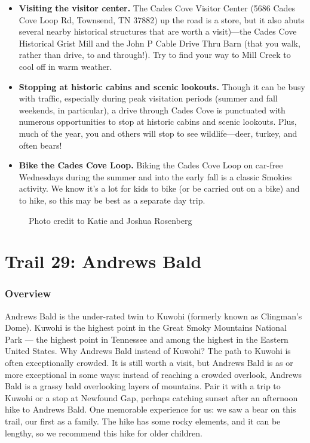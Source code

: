 \documentclass[
  letterpaper,
  DIV=11,
  numbers=noendperiod]{scrreprt}
\makeatletter
\providecommand{\tightlist}{%
  \setlength{\itemsep}{0pt}\setlength{\parskip}{0pt}}\usepackage{longtable,booktabs,array}
\newcommand*\pandocbounded[1]{%
  \sbox\pandoc@box{#1}%
  \Gscale@div\@tempa{\textheight}{\dimexpr\ht\pandoc@box+\dp\pandoc@box\relax}%
  \Gscale@div\@tempb{\linewidth}{\wd\pandoc@box}%
  \ifdim\@tempb\p@<\@tempa\p@\let\@tempa\@tempb\fi%
  \ifdim\@tempa\p@<\p@\scalebox{\@tempa}{\usebox\pandoc@box}%
  \else\usebox{\pandoc@box}%
  \fi%
}
\makeatother
\begin{document}
\begin{itemize}
\tightlist
\item
  \textbf{Visiting the visitor center.} The Cades Cove Visitor Center
  (5686 Cades Cove Loop Rd, Townsend, TN 37882) up the road is a store,
  but it also abuts several nearby historical structures that are worth
  a visit)---the Cades Cove Historical Grist Mill and the John P Cable
  Drive Thru Barn (that you walk, rather than drive, to and through!).
  Try to find your way to Mill Creek to cool off in warm weather.
\item
  \textbf{Stopping at historic cabins and scenic lookouts.} Though it
  can be busy with traffic, especially during peak visitation periods
  (summer and fall weekends, in particular), a drive through Cades Cove
  is punctuated with numerous opportunities to stop at historic cabins
  and scenic lookouts. Plus, much of the year, you and others will stop
  to see wildlife---deer, turkey, and often bears!
\item
  \textbf{Bike the Cades Cove Loop.} Biking the Cades Cove Loop on
  car-free Wednesdays during the summer and into the early fall is a
  classic Smokies activity. We know it's a lot for kids to bike (or be
  carried out on a bike) and to hike, so this may be best as a separate
  day trip.
\end{itemize}

\begin{figure}[H]

{\centering \pandocbounded{\texttt{[image: img/jonah-horse.jpeg]}}

}

\caption{Photo credit to Katie and Joshua Rosenberg}

\end{figure}%

\chapter{Trail 29: Andrews Bald}\label{trail-29-andrews-bald}

\subsection{Overview}\label{overview-29}

Andrews Bald is the under-rated twin to Kuwohi (formerly known as
Clingman's Dome). Kuwohi is the highest point in the Great Smoky
Mountains National Park --- the highest point in Tennessee and among the
highest in the Eastern United States. Why Andrews Bald instead of
Kuwohi? The path to Kuwohi is often exceptionally crowded. It is still
worth a visit, but Andrews Bald is as or more exceptional in some ways:
instead of reaching a crowded overlook, Andrews Bald is a grassy bald
overlooking layers of mountains. Pair it with a trip to Kuwohi or a stop
at Newfound Gap, perhaps catching sunset after an afternoon hike to
Andrews Bald. One memorable experience for us: we saw a bear on this
trail, our first as a family. The hike has some rocky elements, and it
can be lengthy, so we recommend this hike for older children.
\end{document}
